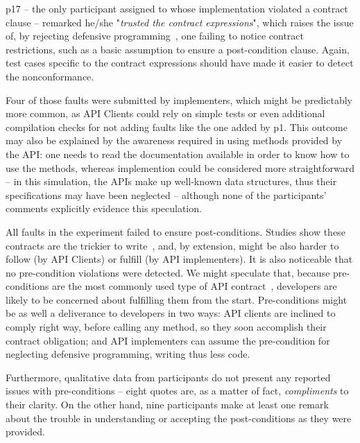 p17 -- the only participant assigned to \contractjdoc{} whose implementation violated a contract clause -- remarked he/she "\emph{trusted the contract expressions}", 
which raises the issue of, by rejecting defensive programming~\cite{}, one failing to notice contract restrictions, such as a basic assumption to ensure a post-condition clause.
Again, test cases specific to the contract expressions should have made it easier to detect the nonconformance.

Four of those faults were submitted by implementers, which might be predictably more common, as API Clients could rely on simple tests or even additional compilation checks for not adding faults like the one added by p1.
This outcome may also be explained by the awareness required in using methods provided by the API: one needs to read the documentation available in order to know how to use the methods, whereas implemention could be considered more straightforward -- in this simulation, 
the APIs make up well-known data structures, thus their specifications may have been neglected -- although none of the participants' comments explicitly evidence this speculation.

All faults in the experiment failed to ensure post-conditions. 
Studies show these contracts are the trickier to write~\cite{}, and, by extension, might be also harder to follow (by API Clients) or fulfill (by API implementers). 
It is also noticeable that no pre-condition violations were detected. We might speculate that, because pre-conditions are the most commonly used type of API contract~\cite{}, developers are likely to be concerned about fulfilling them from the start. 
Pre-conditions might be as well a deliverance to developers in two ways: API clients are inclined to comply right way, before calling any method, so they soon accomplish their contract obligation; and API implementers can assume the pre-condition for neglecting defensive programming, writing thus less code.

Furthermore, qualitative data from participants do not present any reported issues with pre-conditions -- eight quotes are, as a matter of fact, \emph{compliments} to their clarity. On the other hand, nine participants make at least one remark about the trouble in understanding or accepting the post-conditions as they were provided.



